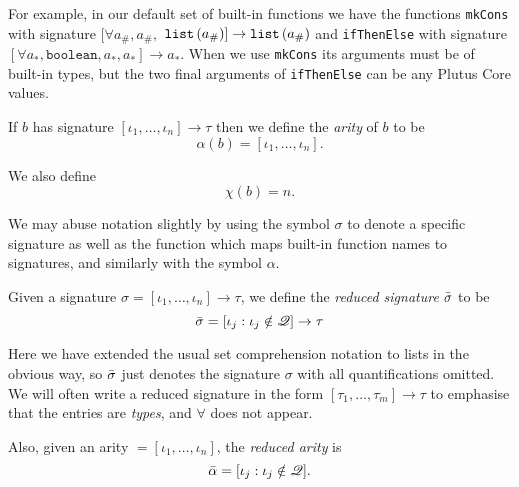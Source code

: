 
\noindent For example, in our default set of built-in functions we have the
functions \texttt{mkCons} with signature $[\forall a_\#, a_\#,$  %
  $\mathtt{list}\,\mathtt{(}a_\#\mathtt{)}] \rightarrow \mathtt{list}\,\mathtt{(}a_\#\mathtt{)}$ and \texttt{ifThenElse} with signature
$[\forall a_*, \mathtt{boolean}, a_*, a_*] \rightarrow a_*$.  When we use
\texttt{mkCons} its arguments must be of built-in types, but the two final
arguments of \texttt{ifThenElse} can be any Plutus Core values.

\smallskip
\noindent If $b$ has signature $[\iota_1, \ldots, \iota_n] \rightarrow \tau$ then we define
the \textit{arity}  of $b$ to be
$$
\alpha(b) = [\iota_1, \ldots, \iota_n].
$$%

\noindent We also define
$$
  \chi(b) = n.
$$%

\noindent We may abuse notation slightly by using the symbol $\sigma$ to denote
a specific signature as well as the function which maps built-in function names
to signatures, and similarly with the symbol $\alpha$.

\medskip
\noindent Given a signature
$\sigma = [\iota_1, \ldots, \iota_n] \rightarrow \tau$,
we define the \textit{reduced signature} $\bar{\sigma}$ to be
$$
\bar{\sigma} = [\iota_j : \iota_j \notin \mathscr{Q}] \rightarrow \tau
$$%

\noindent Here we have extended the usual set comprehension notation to lists in the
obvious way, so $\bar{\sigma}$ just denotes the signature $\sigma$ with all
quantifications omitted. We will often write a reduced signature in the form
$[\tau_1, \ldots, \tau_m] \rightarrow \tau$ to emphasise that the entries are
\textit{types}, and $\mathbf{\forall}$ does not appear.

\medskip
\noindent Also, given an arity $= [\iota_1, \ldots, \iota_n]$, the \textit{reduced
  arity} is 
$$
\bar{\alpha} = [\iota_j : \iota_j \notin \mathscr{Q}].
$$%

